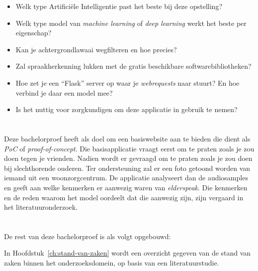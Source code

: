 \begin{itemize}
    \item Welk type Artificiële Intelligentie past het beste bij deze opstelling?
    \item Welk type model van \textit{machine learning} of \textit{deep learning} werkt het beste per eigenschap?
    \item Kan je achtergrondlawaai wegfilteren en hoe precies?
    \item Zal spraakherkenning lukken met de gratis beschikbare softwarebibliotheken?
    \item Hoe zet je een ``Flask'' server op waar je \textit{webrequests} naar stuurt? En hoe verbind je daar een model mee?
    \item Is het nuttig voor zorgkundigen om deze applicatie in gebruik te nemen?
\end{itemize}

\section{}
\label{sec:onderzoeksdoelstelling}

Deze bachelorproef heeft als doel om een basiswebsite aan te bieden die dient als \textit{PoC} of \textit{proof-of-concept}. Die basisapplicatie vraagt eerst om te praten zoals je zou doen tegen je vrienden. Nadien wordt er gevraagd om te praten zoals je zou doen bij slechthorende ouderen. Ter ondersteuning zal er een foto getoond worden van iemand uit een woonzorgcentrum. De applicatie analyseert dan de audiosamples en geeft aan welke kenmerken er aanwezig waren van \textit{elderspeak}.
Die kenmerken en de reden waarom het model oordeelt dat die aanwezig zijn, zijn vergaard in het literatuuronderzoek.

\section{}
\label{sec:opzet-bachelorproef}


De rest van deze bachelorproef is als volgt opgebouwd:

In Hoofdstuk~\ref{ch:stand-van-zaken} wordt een overzicht gegeven van de stand van zaken binnen het onderzoeksdomein, op basis van een literatuurstudie.

